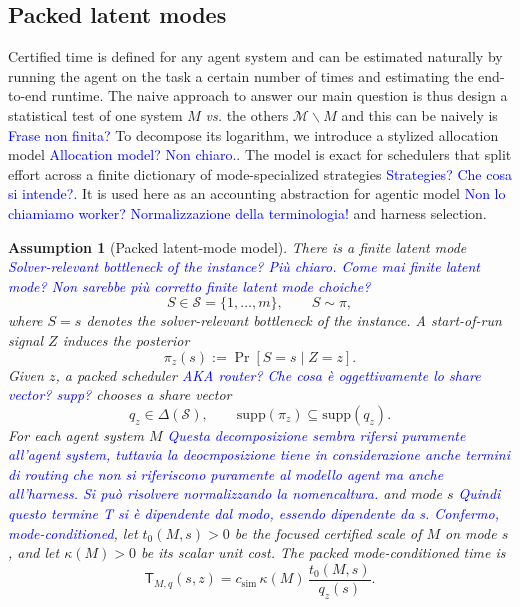 \documentclass{article}
\newtheorem{assumption}{Assumption}
\newcommand{\cS}{\mathcal{S}}
\begin{document}
\subsection{Packed latent modes}
\label{subsec:packed-latent-modes}

Certified time is defined for any agent system and can be estimated naturally by running the agent on the task a certain number of times and estimating the end-to-end runtime. The naive approach to answer our main question is thus design a statistical test of one system $M$ \textit{vs.} the others $\mathcal{M} \backslash M$ and this can be naively  is \textcolor{blue}{Frase non finita?} To decompose its logarithm, we
introduce a stylized allocation model \textcolor{blue}{Allocation model? Non chiaro.}.  The model is exact for schedulers that split effort
across a finite dictionary of mode-specialized strategies \textcolor{blue}{Strategies? Che cosa si intende?}.  It is used here as an accounting
abstraction for agentic model \textcolor{blue}{Non lo chiamiamo worker? Normalizzazione della terminologia!} and harness selection.

\begin{assumption}[Packed latent-mode model]
\label{ass:packed}
There is a finite latent mode \textcolor{blue}{Solver-relevant bottleneck of the instance? Più chiaro. Come mai finite latent mode? Non sarebbe più corretto finite latent mode choiche?}
\[
    S\in\cS=\{1,\ldots,m\},
    \qquad
    S\sim\pi,
\]
where \(S=s\) denotes the solver-relevant bottleneck of the instance.
A start-of-run signal \(Z\) induces the posterior
\[
    \pi_z(s):=\Pr[S=s\mid Z=z].
\]
Given \(z\), a packed scheduler \textcolor{blue}{AKA router? Che cosa è oggettivamente lo share vector? supp? } chooses a share vector
\[
    q_z\in\Delta(\cS),
    \qquad
    \mathrm{supp}(\pi_z)\subseteq \mathrm{supp}(q_z).
\]
For each agent system \(M\) \textcolor{blue}{Questa decomposizione sembra rifersi puramente all'agent system, tuttavia la deocmposizione tiene in considerazione anche termini di routing che non si riferiscono puramente al modello agent ma anche all'harness. Si può risolvere normalizzando la nomencaltura.} and mode \(s\) \textcolor{blue}{Quindi questo termine T si è dipendente dal modo, essendo dipendente da s. Confermo, mode-conditioned}, let \(t_0(M,s)>0\) be the focused
certified scale of \(M\) on mode \(s\), and let \(\kappa(M)>0\) be its scalar unit cost.
The packed mode-conditioned time is
\[
    \mathsf T_{M,q}(s,z)
    =
    c_{\mathrm{sim}}\,
    \kappa(M)\,
    \frac{t_0(M,s)}{q_z(s)} .
\]
\end{assumption}
\end{document}
